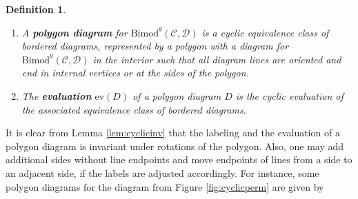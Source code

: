 \documentclass[1.5pt, a4paper]{article}
\newcommand{\mac}{\mathcal C}
\newcommand{\mad}{\mathcal D}
\newcommand{\Bimod}{\mathrm{Bimod}}
\newtheorem{definition}[theorem]{Definition}
\begin{document}
\begin{definition} \label{def:polygon} $\quad$
\begin{enumerate}
\item A {\bf polygon diagram} for $\Bimod^\theta(\mac,\mad)$ is a cyclic equivalence class of bordered diagrams, represented by a polygon with a diagram for $\Bimod^\theta(\mac,\mad)$ in the interior such that all diagram lines are oriented and end in internal vertices or at the sides of the polygon.
\item The {\bf evaluation} $\mathrm{ev}(D)$ of a polygon diagram $D$ is the cyclic evaluation of the associated equivalence class of bordered diagrams.
\end{enumerate}
\end{definition}

 It is  clear from Lemma \ref{lem:cyclicinv} that the labeling and the evaluation of a polygon diagram is invariant under rotations of the polygon. Also, one may add additional sides without line endpoints and move endpoints of  lines  from a side  to an adjacent side, if the labels are adjusted accordingly.  
 For instance, some polygon diagrams for the diagram from Figure \ref{fig:cyclicperm} are  given by
\end{document}
